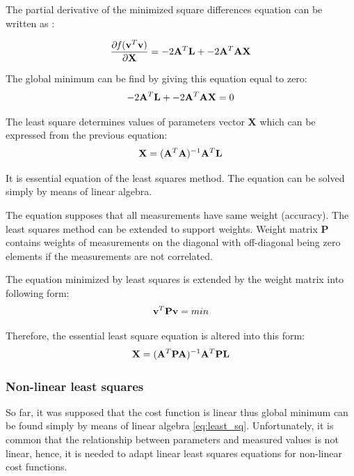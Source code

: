 \documentclass[a4paper,12pt]{article}
\newcommand{\ematr}[1]{%
{\bf #1}%
}
\newcommand{\evect}[1]{%
{\bf #1}%
}
\newcommand{\efunc}[1]{%
{\it #1}%
}
\begin{document}
The partial derivative of the minimized square differences equation can be written as \cite{mathematicalfrederico}:
 
\begin{equation}
\frac{\partial \efunc{f} (\evect{v}^{T} \evect{v}) }{\partial \evect{X}} = -2\ematr{A}^{T} \evect{L} + -2\ematr{A}^{T}\ematr{A} \evect{X} 
\label{eq:least_part}
\end{equation} 

The global minimum can be find by giving this equation equal to zero:
\begin{equation}
-2\ematr{A}^{T} \evect{L} + -2\ematr{A}^{T}\ematr{A} \evect{X} = 0 
\end{equation} 

The least square determines values of parameters vector \evect{X} which can be expressed from the previous equation:
\begin{equation}
\evect{X} = (\ematr{A}^{T} \ematr{A})^{-1} \ematr{A}^{T} \ematr{L}
\end{equation}

It is essential equation of the least squares method. The equation can be solved simply by means of linear algebra.

The equation supposes that all measurements have same weight (accuracy). The least squares method can be extended to support weights.
Weight matrix \ematr{P} contains weights of measurements on the diagonal with off-diagonal being zero elements if
the measurements are not correlated.

The equation minimized by least squares is extended by the weight matrix into following form:
\begin{equation}
\evect{v}^{T}  \ematr{P} \evect{v} = min
\end{equation}

Therefore, the essential least square equation is altered into this form:
\begin{equation}
\label{eq:least_sq}
\evect{X} = (\ematr{A}^{T} \ematr{P} \ematr{A})^{-1} \ematr{A}^{T} \ematr{P} \ematr{L}
\end{equation}

\subsubsection{Non-linear least squares}
\label{sec:non_least}
So far, it was supposed that the cost function is linear thus global minimum can be found simply by means of linear algebra  \eqref{eq:least_sq}.
Unfortunately, it is common that the relationship between parameters and 
measured values is not linear, hence, it is needed to adapt linear least squares equations for non-linear
cost functions.
\end{document}
